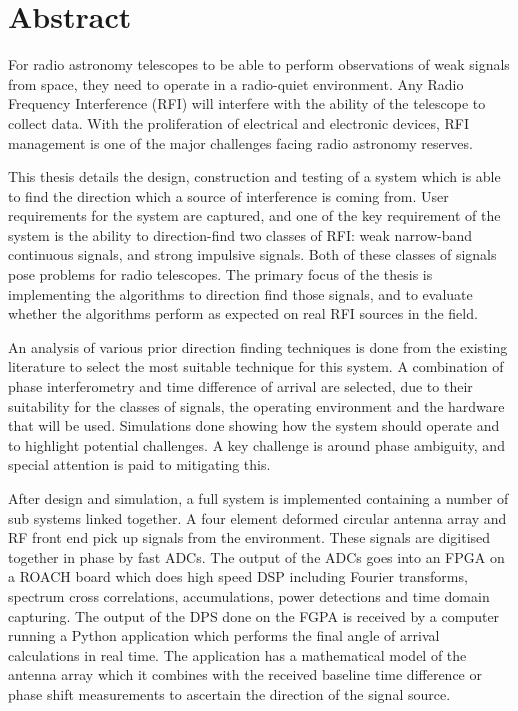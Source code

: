 \chapter{Abstract}

For radio astronomy telescopes to be able to perform observations of weak signals from space, they need to operate in a radio-quiet environment. Any Radio Frequency Interference (RFI) will interfere with the ability of the telescope to collect data. With the proliferation of electrical and electronic devices, RFI management is one of the major challenges facing radio astronomy reserves. 

This thesis details the design, construction and testing of a system which is able to find the direction which a source of interference is coming from. User requirements for the system are captured, and one of the key requirement of the system is the ability to direction-find two classes of RFI: weak narrow-band continuous signals, and strong impulsive signals. Both of these classes of signals pose problems for radio telescopes. The primary focus of the thesis is implementing the algorithms to direction find those signals, and to evaluate whether the algorithms perform as expected on real RFI sources in the field.

An analysis of various prior direction finding techniques is done from the existing literature to select the most suitable technique for this system. A combination of phase interferometry and time difference of arrival are selected, due to their suitability for the classes of signals, the operating environment and the hardware that will be used. Simulations done showing how the system should operate and to highlight potential challenges. A key challenge is around phase ambiguity, and special attention is paid to mitigating this.

After design and simulation, a full system is implemented containing a number of sub systems linked together. A four element deformed circular antenna array and RF front end pick up signals from the environment. These signals are digitised together in phase by fast ADCs. The output of the ADCs goes into an FPGA on a ROACH board which does high speed DSP including Fourier transforms, spectrum cross correlations, accumulations, power detections and time domain capturing. The output of the DPS done on the FGPA is received by a computer running a Python application which performs the final angle of arrival calculations in real time. The application has a mathematical model of the antenna array which it combines with the received baseline time difference or phase shift measurements to ascertain the direction of the signal source.

